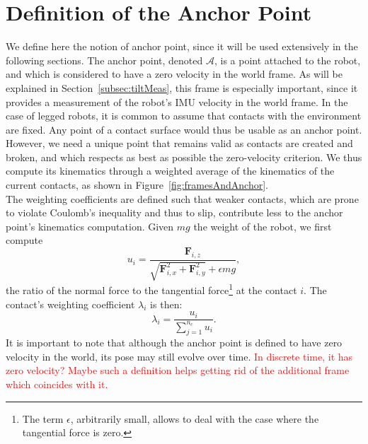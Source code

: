 \documentclass{IJCAS}
\begin{document}
\section{Definition of the Anchor Point}\label{sec:anchor_point}
We define here the notion of anchor point, since it will be used extensively in the following sections. The anchor point, denoted $\mathcal{A}$, is a point attached to the robot, and which is considered to have a zero velocity in the world frame. As will be explained in Section~\ref{subsec:tiltMeas}, this frame is especially important, since it provides a measurement of the robot's IMU velocity in the world frame. In the case of legged robots, it is common to assume that contacts with the environment are fixed. Any point of a contact surface would thus be usable as an anchor point. However, we need a unique point that remains valid as contacts are created and broken, and which respects as best as possible the zero-velocity criterion. We thus compute its kinematics through a weighted average of the kinematics of the current contacts, as shown in Figure~\ref{fig:framesAndAnchor}.  \\
The weighting coefficients are defined such that weaker contacts, which are prone to violate Coulomb's inequality and thus to slip, contribute less to the anchor point's kinematics computation. Given $mg$ the weight of the robot, we first compute 
\begin{equation}
    u_{i} = \frac{\boldsymbol{F}_{i,z}}{\sqrt{\boldsymbol{F}_{i,x}^2 + \boldsymbol{F}_{i,y}^2} + \epsilon mg}, \label{eq:ratio_ui}
\end{equation}
the ratio of the normal force to the tangential force\footnote{The term $\epsilon$, arbitrarily small, allows to deal with the case where the tangential force is zero.} at the contact $i$. The contact's weighting coefficient $\lambda_{i}$ is then:
\begin{equation}
    \lambda_{i}=\frac{u_{i}}{\sum^{n_{c}}_{j=1}u_{i}}.
\end{equation}
It is important to note that although the anchor point is defined to have zero velocity in the world, its pose may still evolve over time. \textcolor{red}{In discrete time, it has zero velocity? Maybe such a definition helps getting rid of the additional frame which coincides with it.}
\end{document}
